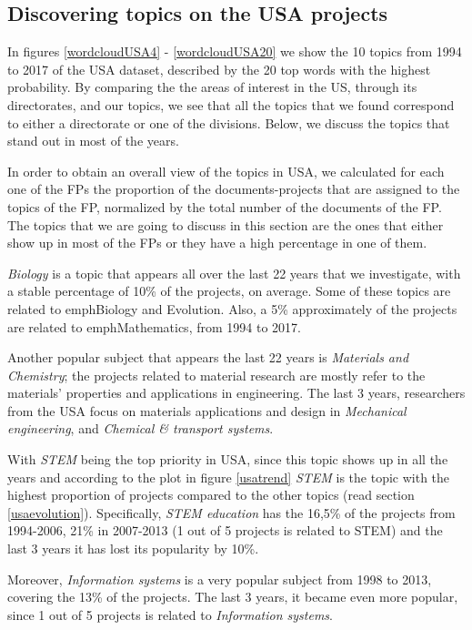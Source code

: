 \documentclass[12pt]{report}
\begin{document}
\vfill
\subsection{Discovering topics on the USA projects}

In figures \ref{wordcloudUSA4} - \ref{wordcloudUSA20} we show the 10 topics 
from 1994 to 2017 of the USA dataset, described by
the 20 top words with the highest probability.
By comparing the the areas of interest in the US, through its directorates, 
and our topics, we see that all the topics that we found correspond to either 
a directorate or one of the divisions. Below, we discuss the topics that
stand out in most of the years.

In order to obtain an overall view of the topics in USA, we calculated for each
one of the FPs the proportion of the documents-projects that are assigned to the
topics of the FP, normalized by the total number of the documents of the FP. The
topics that we are going to discuss in this section are the ones that either
show up in most of the FPs or they have a high percentage in one of them.

\emph{Biology} is a topic that appears all over the last 22 years that we
investigate, with a stable percentage of 10\% of the projects, on average. Some
of these topics are related to emph{Biology and Evolution}. Also, a 5\%
approximately of the projects are related to emph{Mathematics}, from 1994 to
2017.

Another popular subject that appears the last 22 years is \emph{Materials and
Chemistry}; the projects related to material research are mostly refer to the
materials' properties and applications in engineering. The last 3 years,
researchers from the USA focus on materials applications and design in
\emph{Mechanical engineering}, and \emph{Chemical \& transport systems}.

With \emph{STEM} being the top priority in USA, since this topic shows up in all
the years and according to the plot in figure \ref{usatrend} \emph{STEM} is the
topic with the highest proportion of projects compared to the other topics (read
section \ref{usaevolution}). Specifically, \emph{STEM education} has the 16,5\%
of the projects from 1994-2006, 21\% in 2007-2013 (1 out of 5 projects is
related to STEM) and the last 3 years it has lost its popularity by 10\%.

Moreover, \emph{Information systems} is a very popular subject from 1998 to 2013, 
covering the 13\% of the projects. The last 3 years, it became even more popular, 
since 1 out of 5 projects is related to \emph{Information systems}.
\end{document}
